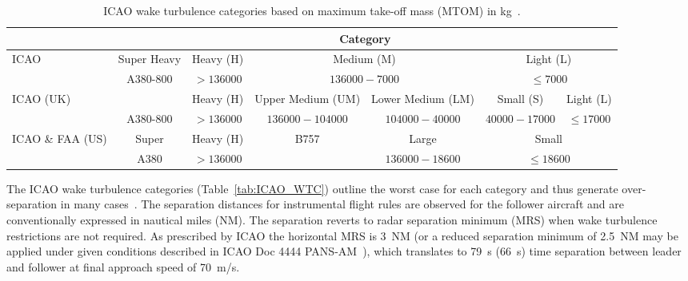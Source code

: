 \begin{table}[h]
    \centering
    \resizebox{1\textwidth}{!} {
    \begin{tabular}{l|c|c|c|c|c|c}
    ~    & \multicolumn{6}{c}{Category} \\ \hline
    ICAO & Super Heavy & Heavy (H) & \multicolumn{2}{c|}{Medium (M)} & \multicolumn{2}{c}{Light (L)} \\
    
    ~    & A380-800    & $ > 136000 $  & \multicolumn{2}{c|}{$ 136000-7000 $ } & \multicolumn{2}{c}{$ \leq 7000 $} \\ \hline
    
    ICAO (UK)   & ~  & Heavy (H) & Upper Medium (UM) & Lower Medium (LM) & Small (S)  & Light (L) \\
    
    ~    & A380-800    & $ > 136000 $  & $ 136000-104000 $     & $ 104000-40000 $      & $ 40000-17000 $ & $ \leq 17000 $   \\ \hline
    
    ICAO \& FAA (US)   & Super      & Heavy (H) & B757   & Large   & \multicolumn{2}{c}{Small} \\
    
    ~    & A380        & $ > 136000 $  & ~                 & $ 136000-18600 $      & \multicolumn{2}{c}{$ \leq 18600 $} \\ 
    \end{tabular}}
    \caption[ICAO wake turbulence categories based on maximum take-off mass]{ICAO wake turbulence categories based on maximum take-off mass (MTOM) in kg~\cite{icao_wtc, uk_aeronautical_information_services_wake_2017, kolos2013influence}.} \label{tab:WTC}
\end{table}

The ICAO wake turbulence categories (Table~\ref{tab:ICAO_WTC}) outline the worst case for each category and thus generate over-separation in many cases~\cite{noauthor_recat_2018}. The separation distances for instrumental flight rules are observed for the follower aircraft and are conventionally expressed in nautical miles (NM). The separation reverts to radar separation minimum (MRS) when wake turbulence restrictions are not required. As  prescribed  by  ICAO  the  horizontal MRS is 3~NM (or a reduced separation minimum of 2.5~NM may be applied under given conditions described in ICAO Doc 4444 PANS-AM~\cite{doc44444}), which translates to 79~s (66~s) time separation between leader and follower at final approach speed of 70~m/s.


